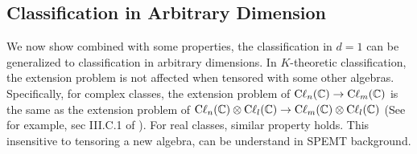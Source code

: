 \documentclass{article}
\begin{document}
\subsection{Classification in Arbitrary Dimension}
\label{sec:Classification in Arbitrary Dimension}
We now show combined with some properties, the classification in $d=1$ can be
generalized to classification in arbitrary dimensions. In $K$-theoretic
classification, the extension problem is not affected when tensored with some
other algebras. Specifically, for complex classes, the extension problem of
$\mathrm{C\ell}_{n}(\mathbb{C})\to\mathrm{C\ell}_{m}(\mathbb{C})$ is the same as the extension
problem of $\mathrm{C\ell}_{n}(\mathbb{C})\otimes\mathrm{C\ell}_{l}(\mathbb{C})\to
\mathrm{C\ell}_{m}(\mathbb{C})\otimes\mathrm{C\ell}_{l}(\mathbb{C})$ (See for example, sec
III.C.1 of \cite{Chiu2016}). For real classes, similar property holds.
This insensitive to tensoring a new algebra, can be understand in SPEMT
background.
\end{document}

